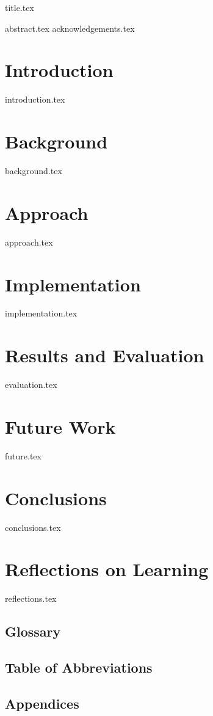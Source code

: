 \documentclass[11pt,a4paper,twoside,openright]{book}
\begin{document}
	\begin{titlepage}
		{title.tex}
	\end{titlepage}
	\restoregeometry

	\frontmatter

	{abstract.tex}
	{acknowledgements.tex}

	\tableofcontents
	\listoffigures
	\listoftables

	\mainmatter

	\chapter{Introduction}
		{introduction.tex}

	\chapter{Background}
		{background.tex}

	\chapter{Approach}
		{approach.tex}

	\chapter{Implementation}
		{implementation.tex}

	\chapter{Results and Evaluation}
		{evaluation.tex}

	\chapter{Future Work}
		{future.tex}

	\chapter{Conclusions}
		{conclusions.tex}

	\chapter{Reflections on Learning}
		{reflections.tex}

	\backmatter
	\section*{Glossary}
	\section*{Table of Abbreviations}
	\section*{Appendices}

	\printbibliography
\end{document}
